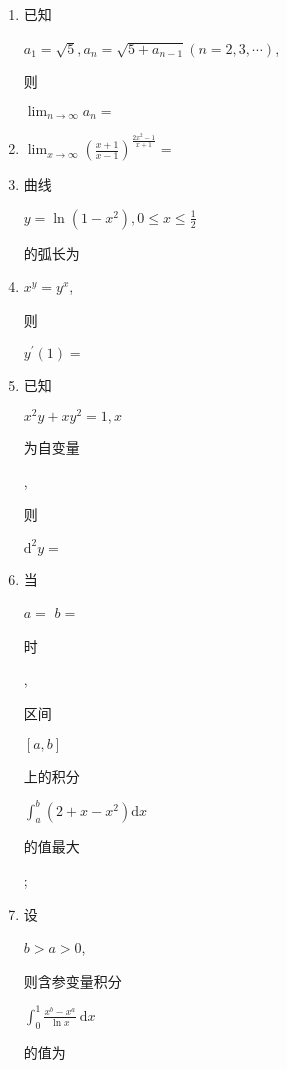 \documentclass[10pt]{article}
\begin{document}
\begin{enumerate}
  \item \begin{CJK}{UTF8}{mj}已知\end{CJK} $a_{1}=\sqrt{5}, a_{n}=\sqrt{5+a_{n-1}}(n=2,3, \cdots)$, \begin{CJK}{UTF8}{mj}则\end{CJK} $\lim _{n \rightarrow \infty} a_{n}=$

  \item $\lim _{x \rightarrow \infty}\left(\frac{x+1}{x-1}\right)^{\frac{2 x^{2}-1}{x+1}}=$

  \item \begin{CJK}{UTF8}{mj}曲线\end{CJK} $y=\ln \left(1-x^{2}\right), 0 \leqslant x \leqslant \frac{1}{2}$ \begin{CJK}{UTF8}{mj}的弧长为\end{CJK}

  \item $x^{y}=y^{x}$, \begin{CJK}{UTF8}{mj}则\end{CJK} $y^{\prime}(1)=$

  \item \begin{CJK}{UTF8}{mj}已知\end{CJK} $x^{2} y+x y^{2}=1, x$ \begin{CJK}{UTF8}{mj}为自变量\end{CJK}, \begin{CJK}{UTF8}{mj}则\end{CJK} $\mathrm{d}^{2} y=$

  \item \begin{CJK}{UTF8}{mj}当\end{CJK} $a=$ $b=$ \begin{CJK}{UTF8}{mj}时\end{CJK}, \begin{CJK}{UTF8}{mj}区间\end{CJK} $[a, b]$ \begin{CJK}{UTF8}{mj}上的积分\end{CJK} $\int_{a}^{b}\left(2+x-x^{2}\right) \mathrm{d} x$ \begin{CJK}{UTF8}{mj}的值最大\end{CJK};

  \item \begin{CJK}{UTF8}{mj}设\end{CJK} $b>a>0$, \begin{CJK}{UTF8}{mj}则含参变量积分\end{CJK} $\int_{0}^{1} \frac{x^{b}-x^{a}}{\ln x} \mathrm{~d} x$ \begin{CJK}{UTF8}{mj}的值为\end{CJK}


\end{enumerate}
\end{document}
